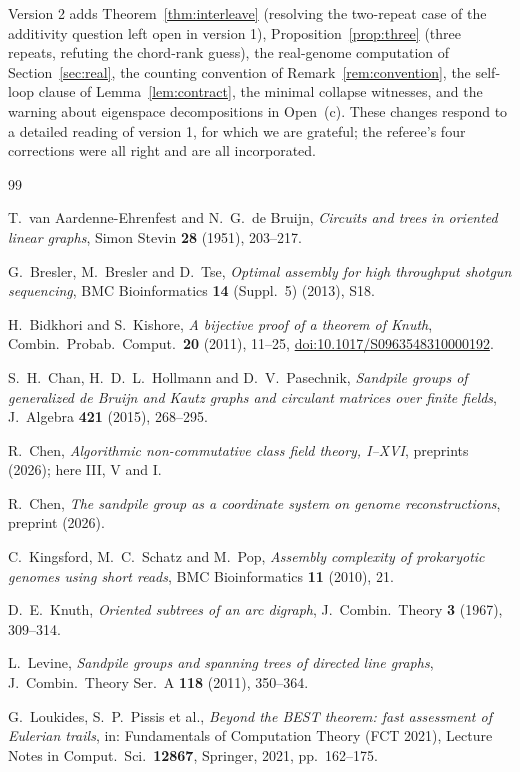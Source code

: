 \documentclass[11pt]{article}
\theoremstyle{plain}
\theoremstyle{definition}
\theoremstyle{remark}
\begin{document}
Version 2 adds Theorem~\ref{thm:interleave} (resolving the two-repeat case of the
additivity question left open in version 1), Proposition~\ref{prop:three} (three repeats,
refuting the chord-rank guess), the real-genome computation of
Section~\ref{sec:real}, the counting convention of Remark~\ref{rem:convention}, the
self-loop clause of Lemma~\ref{lem:contract}, the minimal collapse witnesses, and the
warning about eigenspace decompositions in Open~(c). These changes respond to a detailed
reading of version 1, for which we are grateful; the referee's four corrections were all
right and are all incorporated.

\begin{thebibliography}{99}

 T.~van Aardenne-Ehrenfest and N.~G.~de Bruijn,
\emph{Circuits and trees in oriented linear graphs},
Simon Stevin \textbf{28} (1951), 203--217.

 G.~Bresler, M.~Bresler and D.~Tse,
\emph{Optimal assembly for high throughput shotgun sequencing},
BMC Bioinformatics \textbf{14} (Suppl.~5) (2013), S18.

 H.~Bidkhori and S.~Kishore,
\emph{A bijective proof of a theorem of Knuth},
Combin.\ Probab.\ Comput.\ \textbf{20} (2011), 11--25,
\href{https://doi.org/10.1017/S0963548310000192}{doi:10.1017/S0963548310000192}.

 S.~H.~Chan, H.~D.~L.~Hollmann and D.~V.~Pasechnik,
\emph{Sandpile groups of generalized de Bruijn and Kautz graphs and circulant matrices over
finite fields}, J.\ Algebra \textbf{421} (2015), 268--295.

 R.~Chen,
\emph{Algorithmic non-commutative class field theory, I--XVI},
preprints (2026); here III, V and I.

 R.~Chen,
\emph{The sandpile group as a coordinate system on genome reconstructions},
preprint (2026).

 C.~Kingsford, M.~C.~Schatz and M.~Pop,
\emph{Assembly complexity of prokaryotic genomes using short reads},
BMC Bioinformatics \textbf{11} (2010), 21.

 D.~E.~Knuth,
\emph{Oriented subtrees of an arc digraph},
J.\ Combin.\ Theory \textbf{3} (1967), 309--314.

 L.~Levine,
\emph{Sandpile groups and spanning trees of directed line graphs},
J.\ Combin.\ Theory Ser.~A \textbf{118} (2011), 350--364.

 G.~Loukides, S.~P.~Pissis et al.,
\emph{Beyond the BEST theorem: fast assessment of Eulerian trails},
in: Fundamentals of Computation Theory (FCT 2021), Lecture Notes in Comput.\ Sci.\
\textbf{12867}, Springer, 2021, pp.~162--175.


\end{thebibliography}
\end{document}

